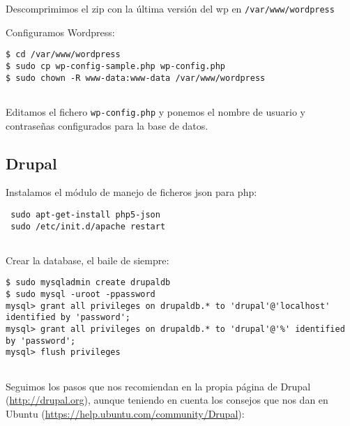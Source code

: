 Descomprimimos el zip con la última versión del wp en
\texttt{/var/www/wordpress}

Configuramos Wordpress:

\begin{verbatim}
$ cd /var/www/wordpress
$ sudo cp wp-config-sample.php wp-config.php
$ sudo chown -R www-data:www-data /var/www/wordpress
      
\end{verbatim}

Editamos el fichero \texttt{wp-config.php} y ponemos el nombre de
usuario y contraseñas configurados para la base de datos.

\subsection{Drupal}\label{drupal}

Instalamos el módulo de manejo de ficheros json para php:

\begin{verbatim}
 sudo apt-get-install php5-json
 sudo /etc/init.d/apache restart
      
\end{verbatim}

Crear la database, el baile de siempre:

\begin{verbatim}
$ sudo mysqladmin create drupaldb
$ sudo mysql -uroot -ppassword
mysql> grant all privileges on drupaldb.* to 'drupal'@'localhost' identified by 'password';
mysql> grant all privileges on drupaldb.* to 'drupal'@'%' identified by 'password';
mysql> flush privileges
      
\end{verbatim}

Seguimos los pasos que nos recomiendan en la propia página de Drupal
(\url{http://drupal.org}), aunque teniendo en cuenta los consejos que
nos dan en Ubuntu (\url{https://help.ubuntu.com/community/Drupal}):

